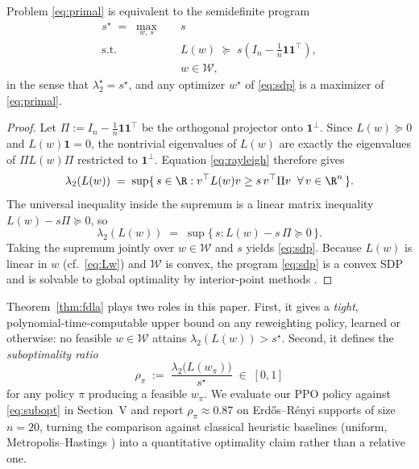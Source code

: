 \begin{theorem}
\label{thm:fdla}
Problem \eqref{eq:primal} is equivalent to the semidefinite program
\begin{equation}
\begin{aligned}
s^\star \;=\; \max_{w,\,s} \quad & s \\
\text{s.t.} \quad & L(w) \;\succeq\; s\!\left(I_n - \tfrac{1}{n}\mathbf{1}\mathbf{1}^\top\right), \\
& w \in \mathcal{W},
\end{aligned}
\label{eq:sdp}
\end{equation}
in the sense that $\lambda_2^\star = s^\star$, and any optimizer
$w^\star$ of \eqref{eq:sdp} is a maximizer of \eqref{eq:primal}.
\end{theorem}

\begin{proof}
Let $\Pi := I_n - \tfrac{1}{n}\mathbf{1}\mathbf{1}^\top$ be the
orthogonal projector onto $\mathbf{1}^\perp$. Since $L(w) \succeq 0$
and $L(w)\mathbf{1} = 0$, the nontrivial eigenvalues of $L(w)$ are
exactly the eigenvalues of $\Pi L(w) \Pi$ restricted to
$\mathbf{1}^\perp$. Equation \eqref{eq:rayleigh} therefore gives
\[
\lambda_2(L(w)) \;=\; \sup\{\, s \in \R : v^\top L(w) v \ge s\, v^\top \Pi v
\;\; \forall\, v \in \R^n \,\}.
\]
The universal inequality inside the supremum is a linear matrix
inequality $L(w) - s\Pi \succeq 0$, so
\[
\lambda_2(L(w)) \;=\; \sup\{\, s : L(w) - s\,\Pi \succeq 0 \,\}.
\]
Taking the supremum jointly over $w \in \mathcal{W}$ and $s$
yields \eqref{eq:sdp}. Because $L(w)$ is linear in $w$
(cf.~\eqref{eq:Lw}) and $\mathcal{W}$ is convex, the program
\eqref{eq:sdp} is a convex SDP and is solvable to global optimality by
interior-point methods
\cite{BoydVandenberghe2004,XiaoBoyd2004}.
\end{proof}

Theorem~\ref{thm:fdla} plays two roles in this paper. First, it gives a
\emph{tight}, polynomial-time-computable upper bound on any reweighting
policy, learned or otherwise: no feasible $w \in \mathcal{W}$ attains
$\lambda_2(L(w)) > s^\star$. Second, it defines the
\emph{suboptimality ratio}
\begin{equation}
\rho_\pi \;:=\; \frac{\lambda_2\!\big(L(w_\pi)\big)}{s^\star}
\;\in\; [0, 1]
\label{eq:subopt}
\end{equation}
for any policy $\pi$ producing a feasible $w_\pi$. We evaluate our
PPO policy against \eqref{eq:subopt} in Section~V and report
$\rho_\pi \approx 0.87$ on Erd\H{o}s--R\'enyi supports of size
$n = 20$, turning the comparison against classical heuristic baselines
(uniform, Metropolis--Hastings \cite{XiaoBoyd2004,Boyd2004}) into a
quantitative optimality claim rather than a relative one.

